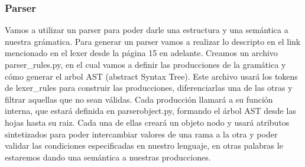 \subsubsection{Parser}
Vamos a utilizar un parser para poder darle una estructura y una semántica a nuestra grámatica.
Para generar un parser vamos a realizar lo descripto en el link mencionado en el lexer desde la página 15 en adelante. Creamos un archivo parser\_rules.py, en el cual vamos a definir las producciones de la gramática y cómo generar el arbol AST (abstract Syntax Tree). Este archivo usará los tokens de lexer\_rules para construir las producciones, diferenciarlas una de las otras y filtrar aquellas que no sean válidas.\newline
Cada producción llamará a su función interna, que estará definida en parserobject.py, formando el árbol AST desde las hojas hasta su raiz. Cada una de ellas creará un objeto nodo y usará atributos sintetizados para poder intercambiar valores de una rama a la otra y poder validar las condiciones especificadas en nuestro lenguaje, en otras palabras le estaremos dando una semántica a nuestras producciones.